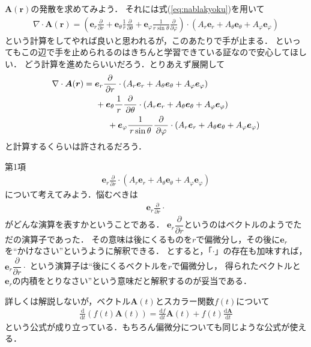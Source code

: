 $\bm{A}(\bm{r})$の発散を求めてみよう．
それには式(\ref{eq:nablakyoku})を用いて
\begin{align*}
\nabla \cdot \bm{A}(\bm{r}) = \left(
\bm{e}_r \frac{ \partial } {\partial r} 
+ \bm{e}_{\theta} \frac{1}{r} \frac{ \partial } {\partial \theta}
+ \bm{e}_{\varphi} \frac{1}{r \sin \theta } \frac{ \partial } {\partial \varphi} \right)
\cdot ( A_r \bm{e}_r + A_\theta \bm{e}_\theta + A_\varphi \bm{e}_\varphi )
\end{align*}
という計算をしてやれば良いと思われるが，このあたりで手が止まる．
といってもこの辺で手を止められるのはきちんと学習できている証なので安心してほしい．
どう計算を進めたらいいだろう．とりあえず展開して
\begin{align*}
\nabla \cdot \bm{A}(\bm{r}) & = 
\bm{e}_r \frac{ \partial } {\partial r} \cdot 
( A_r \bm{e}_r + A_\theta \bm{e}_\theta + A_\varphi \bm{e}_\varphi ) \\
& \hspace{0.5cm} + 
 \bm{e}_{\theta} \frac{1}{r} \frac{ \partial } {\partial \theta} \cdot
 ( A_r \bm{e}_r + A_\theta \bm{e}_\theta + A_\varphi \bm{e}_\varphi ) \\
& \hspace{1cm} + 
 \bm{e}_{\varphi} \frac{1}{r \sin \theta } \frac{ \partial } {\partial \varphi}
 \cdot ( A_r \bm{e}_r + A_\theta \bm{e}_\theta + A_\varphi \bm{e}_\varphi )
\end{align*}
と計算するくらいは許されるだろう．

第1項
\begin{align*}
\bm{e}_r \frac{ \partial } {\partial r} \cdot 
( A_r \bm{e}_r + A_\theta \bm{e}_\theta + A_\varphi \bm{e}_\varphi )
\end{align*}
について考えてみよう．悩むべきは
\begin{align*}
\bm{e}_r \frac{ \partial } {\partial r} \cdot
\end{align*}
がどんな演算を表すかということである．
$\bm{e}_r \dfrac{ \partial }{\partial r}$というのはベクトルのようでただの演算子であった．
その意味は後にくるものを$r$で偏微分し，その後に$\bm{e}_r$を``かけなさい''というように解釈できる．
とすると，「$\cdot$」の存在も加味すれば，$\bm{e}_r \dfrac{ \partial } {\partial r} \cdot$
という演算子は``後にくるベクトルを$r$で偏微分し，
得られたベクトルと$\bm{e}_r$の内積をとりなさい''という意味だと解釈するのが妥当である．

詳しくは解説しないが，ベクトル$\bm{A}(t)$とスカラー関数$f(t)$について
\begin{align}
\frac{ \mathrm{d} } { \mathrm{d} t} ( f(t) \bm{A}(t) ) 
=\frac{ \mathrm{d} f } { \mathrm{d} t} \bm{A} (t)
+ f(t) \frac{ \mathrm{d} \bm{A} } { \mathrm{d} t} 
\label{eq:vecsukarabibun}
\end{align}
という公式が成り立っている．もちろん偏微分についても同じような公式が使える．

